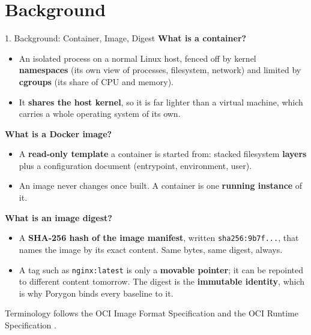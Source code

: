 \documentclass[aspectratio=169, 11pt]{beamer}
\newcommand{\hl}[1]{\textcolor{keyRed}{\textbf{#1}}}
\begin{document}
\section{Background}
\begin{frame}{1. Background: Container, Image, Digest}
    \footnotesize
    \textbf{What is a \hl{container}?}
    \begin{itemize}\setlength\itemsep{1pt}
        \item An isolated process on a normal Linux host, fenced off by kernel \hl{namespaces} (its own view of processes, filesystem, network) and limited by \hl{cgroups} (its share of CPU and memory).
        \item It \hl{shares the host kernel}, so it is far lighter than a virtual machine, which carries a whole operating system of its own.
    \end{itemize}
    \vspace{0.12cm}
    \textbf{What is a \hl{Docker image}?}
    \begin{itemize}\setlength\itemsep{1pt}
        \item A \hl{read-only template} a container is started from: stacked filesystem \hl{layers} plus a configuration document (entrypoint, environment, user).
        \item An image never changes once built. A container is one \hl{running instance} of it.
    \end{itemize}
    \vspace{0.12cm}
    \textbf{What is an image \hl{digest}?}
    \begin{itemize}\setlength\itemsep{1pt}
        \item A \hl{SHA-256 hash of the image manifest}, written \texttt{sha256:9b7f...}, that names the image by its exact content. Same bytes, same digest, always.
        \item A tag such as \texttt{nginx:latest} is only a \hl{movable pointer}; it can be repointed to different content tomorrow. The digest is the \hl{immutable identity}, which is why Porygon binds every baseline to it.
    \end{itemize}
    \vspace{0.1cm}
    \scriptsize Terminology follows the OCI Image Format Specification and the OCI Runtime Specification \cite{ociimage}.
\end{frame}
\end{document}
